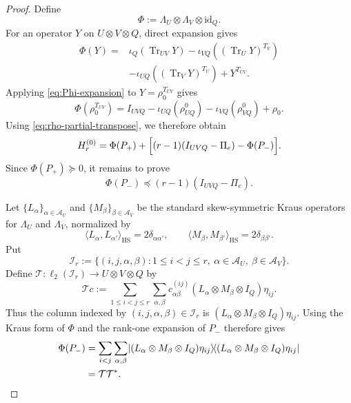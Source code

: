 \documentclass[11pt,reqno]{amsart}
\theoremstyle{remark}
\DeclareMathOperator{\Tr}{Tr}
\newcommand{\id}{\mathrm{id}}
\newcommand{\ketbra}[2]{\lvert #1\rangle\!\langle #2\rvert}
\begin{document}
\begin{proof}
Define
\[
    \Phi
    :=
    \Lambda_U\otimes\Lambda_V\otimes\id_Q.
\]
For an operator $Y$ on $U\otimes V\otimes Q$, direct expansion gives
\begin{equation}
\label{eq:Phi-expansion}
\begin{aligned}
    \Phi(Y)
    ={}&
    \iota_Q(\Tr_{UV}Y)
    -\iota_{VQ}\!\left((\Tr_UY)^{T_V}\right)\\
    &-\iota_{UQ}\!\left((\Tr_VY)^{T_U}\right)
    +Y^{T_{UV}}.
\end{aligned}
\end{equation}
Applying \cref{eq:Phi-expansion} to $Y=\rho_0^{T_{UV}}$ gives
\begin{equation}
\label{eq:Phi-rhoT}
    \Phi(\rho_0^{T_{UV}})
    =
    I_{UVQ}
    -\iota_{UQ}(\rho^0_{UQ})
    -\iota_{VQ}(\rho^0_{VQ})
    +\rho_0.
\end{equation}
Using \cref{eq:rho-partial-transpose}, we therefore obtain
\begin{equation}
\label{eq:H-decomposition}
    H_r^{(0)}
    =
    \Phi(P_+)
    +
    \Bigl[
      (r-1)(I_{UVQ}-\Pi_e)-\Phi(P_-)
    \Bigr].
\end{equation}
Since $\Phi(P_+)\succeq0$, it remains to prove
\begin{equation}
\label{eq:Phi-Pminus-goal}
    \Phi(P_-)
    \preceq
    (r-1)(I_{UVQ}-\Pi_e).
\end{equation}

Let $\{L_\alpha\}_{\alpha\in\mathcal A_U}$ and
$\{M_\beta\}_{\beta\in\mathcal A_V}$ be the standard
skew-symmetric Kraus operators for $\Lambda_U$ and $\Lambda_V$,
normalized by
\[
    \langle L_\alpha,L_{\alpha'}\rangle_{\mathrm{HS}}
    =2\delta_{\alpha\alpha'},
    \qquad
    \langle M_\beta,M_{\beta'}\rangle_{\mathrm{HS}}
    =2\delta_{\beta\beta'}.
\]
Put
\[
    \mathcal I_r
    :=
    \{(i,j,\alpha,\beta):
       1\le i<j\le r,
       \ \alpha\in\mathcal A_U,
       \ \beta\in\mathcal A_V\}.
\]
Define
$\mathcal T:\ell_2(\mathcal I_r)\to U\otimes V\otimes Q$ by
\begin{equation}
\label{eq:T-definition}
    \mathcal Tc
    :=
    \sum_{1\le i<j\le r}
    \sum_{\alpha,\beta}
    c_{\alpha\beta}^{(ij)}
    (L_\alpha\otimes M_\beta\otimes I_Q)\eta_{ij}.
\end{equation}
Thus the column indexed by
$(i,j,\alpha,\beta)\in\mathcal I_r$ is
$(L_\alpha\otimes M_\beta\otimes I_Q)\eta_{ij}$.  Using the Kraus
form of $\Phi$ and the rank-one expansion of $P_-$ therefore gives
\begin{align}
    \Phi(P_-)
    &=
    \sum_{i<j}\sum_{\alpha,\beta}
    \ketbra{
      (L_\alpha\otimes M_\beta\otimes I_Q)\eta_{ij}}
      {(L_\alpha\otimes M_\beta\otimes I_Q)\eta_{ij}}
    \notag\\
    &=\mathcal T\mathcal T^*.
\label{eq:Phi-Pminus-TTstar}
\end{align}


\end{proof}
\end{document}
